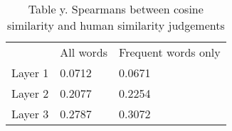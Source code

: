 \begin{table}[]
	\centering
	\caption{Table y. Spearmans \rho between cosine similarity and human similarity judgements} %
	\begin{tabular}{lll}
		& All words      & Frequent words only         \\
		Layer 1 & 0.0712 & 0.0671 \\
		Layer 2 & 0.2077 & 0.2254 \\
		Layer 3 & 0.2787 & 0.3072 
	\end{tabular}
\end{table}


